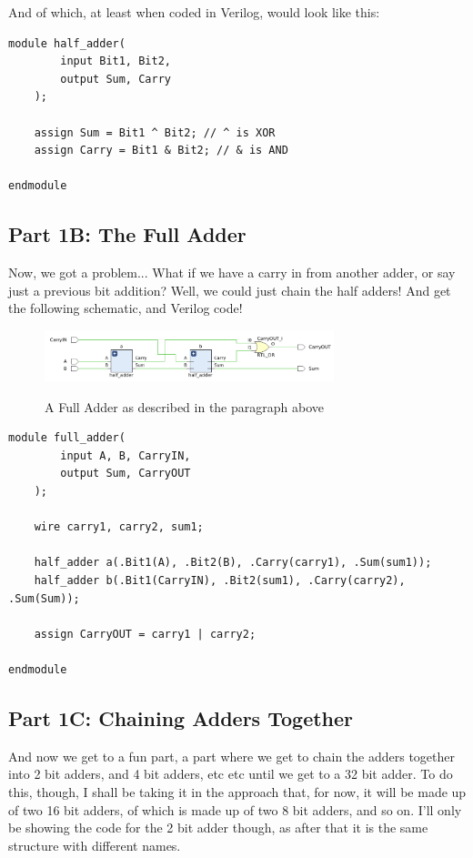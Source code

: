 And of which, at least when coded in Verilog, would look like this:
\begin{lstlisting}[caption={Half Adder Verilog Code}, label={Half Adder Verilog}, style=Verilog]
module half_adder(
        input Bit1, Bit2,
        output Sum, Carry
    );
    
    assign Sum = Bit1 ^ Bit2; // ^ is XOR
    assign Carry = Bit1 & Bit2; // & is AND
    
endmodule
\end{lstlisting}

\subsection{Part 1B: The Full Adder}
\qquad
Now, we got a problem... What if we have a carry in from another adder, or say just a previous bit addition? Well, we could just chain the half adders! And get the following schematic, and Verilog code!
\begin{figure}[!htbp]
    \centering
    \caption{A Full Adder as described in the paragraph above}
    \includegraphics[width=0.75\textwidth]{pictures/part1/full_adder.png}
    \label{Full Adder}
\end{figure}
\begin{lstlisting}[caption={Full Adder Verilog Code}, label={Full Adder Verilog}, style=Verilog]
module full_adder(
        input A, B, CarryIN,
        output Sum, CarryOUT
    );
    
    wire carry1, carry2, sum1;
    
    half_adder a(.Bit1(A), .Bit2(B), .Carry(carry1), .Sum(sum1));
    half_adder b(.Bit1(CarryIN), .Bit2(sum1), .Carry(carry2), .Sum(Sum));
    
    assign CarryOUT = carry1 | carry2; 
    
endmodule
\end{lstlisting}

\subsection{Part 1C: Chaining Adders Together}
\qquad And now we get to a fun part, a part where we get to chain the adders together into 2 bit adders, and 4 bit adders, etc etc until we get to a 32 bit adder. To do this, though, I shall be taking it in the approach that, for now, it will be made up of two 16 bit adders, of which is made up of two 8 bit adders, and so on. I'll only be showing the code for the 2 bit adder though, as after that it is the same structure with different names.\\

